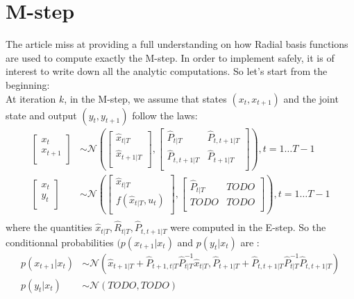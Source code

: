 \section{M-step}

The article miss at providing a full understanding on how Radial basis functions are used to compute exactly the M-step. In order to implement safely, it is of interest to write down all the analytic computations. So let's start from the beginning:\\

At iteration $k$, in the M-step, we assume that states $(x_t, x_{t+1})$ and the joint state and output $(y_t, y_{t+1})$ follow the laws:
\begin{align*}
  \left[ \begin{array}{c} x_{t}\\ x_{t+1}\\ \end{array} \right] &\sim
    \mathcal{N}\left(
      \left[ \begin{array}{c} \hat{x}_{t|T}\\ \hat{x}_{t+1|T}\\ \end{array} \right],
      \left[ \begin{array}{cc} \hat{P}_{t|T} & \hat{P}_{t,t+1|T}\\ \hat{P}_{t,t+1|T} & \hat{P}_{t+1|T}\\ \end{array} \right]
    \right),
    t=1 \ldots T-1\\
  \left[ \begin{array}{c} x_{t}\\ y_{t}\\ \end{array} \right] &\sim
    \mathcal{N}\left(
      \left[ \begin{array}{c} \hat{x}_{t|T}\\  f(\hat{x}_{t|T}, u_t)\\ \end{array} \right],
      \left[ \begin{array}{cc} \hat{P}_{t|T} & TODO \\ TODO & TODO\\ \end{array} \right]
    \right),
    t=1 \ldots T-1\\
\end{align*}
where the quantities $ \hat{x}_{t|T}, \hat{R}_{t|T}, \hat{P}_{t,t+1|T}$ were computed in the E-step.
So the conditionnal probabilities $(p(x_{t+1} | x_t)$ and $p(y_t | x_t)$ are :
\begin{align*}
  p(x_{t+1} | x_t) &\sim \mathcal{N}\left( \hat{x}_{t+1|T} + \hat{P}_{t+1,t|T}\hat{P}_{t|T}^{-1}\hat{x}_{t|T}, \hat{P}_{t+1|T} +\hat{P}_{t,t+1|T} \hat{P}_{t|T}^{-1} \hat{P}_{t,t+1|T} \right)\\
  p(y_t | x_t) &\sim \mathcal{N}\left( TODO , TODO \right)\\
\end{align*}

